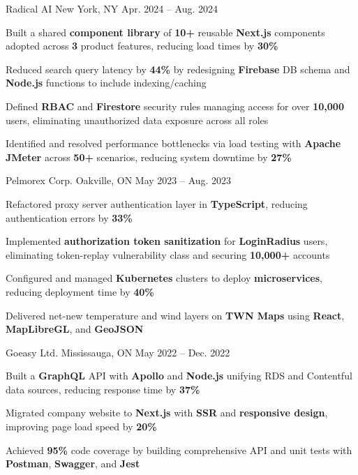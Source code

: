 \documentclass[11pt, a4paper]{awesome-cv}
\begin{document}
\begin{cventries}
  \cventry
    {\color{lightblue}{SOFTWARE ENGINEER INTERN}}
    {Radical AI}
    {New York, NY}
    {Apr. 2024 -- Aug. 2024}
    {
      \begin{cvitems}
        \item{Built a shared \textbf{component library} of \textbf{10+} reusable \textbf{Next.js} components adopted across \textbf{3} product features, reducing load times by \textbf{30\%}}
        \item{Reduced search query latency by \textbf{44\%} by redesigning \textbf{Firebase} DB schema and \textbf{Node.js} functions to include indexing/caching}
        \item{Defined \textbf{RBAC} and \textbf{Firestore} security rules managing access for over \textbf{10,000} users, eliminating unauthorized data exposure across all roles}
        \item{Identified and resolved performance bottlenecks via load testing with \textbf{Apache JMeter} across \textbf{50+} scenarios, reducing system downtime by \textbf{27\%}}
      \end{cvitems}
    }

  \vspace{3mm}

  \cventry
    {\color{lightblue}{SOFTWARE ENGINEER INTERN}}
    {Pelmorex Corp.}
    {Oakville, ON}
    {May 2023 -- Aug. 2023}
    {
      \begin{cvitems}
        \item{Refactored proxy server authentication layer in \textbf{TypeScript}, reducing authentication errors by \textbf{33\%}}
        \item{Implemented \textbf{authorization token sanitization} for \textbf{LoginRadius} users, eliminating token-replay vulnerability class and securing \textbf{10,000+} accounts}
        \item{Configured and managed \textbf{Kubernetes} clusters to deploy \textbf{microservices}, reducing deployment time by \textbf{40\%}}
        \item{Delivered net-new temperature and wind layers on \textbf{TWN Maps} using \textbf{React}, \textbf{MapLibreGL}, and \textbf{GeoJSON}}
      \end{cvitems}
    }

  \vspace{3mm}

  \cventry
    {\color{lightblue}{FRONT-END DEVELOPER INTERN}}
    {Goeasy Ltd.}
    {Mississauga, ON}
    {May 2022 -- Dec. 2022}
    {
      \begin{cvitems}
        \item{Built a \textbf{GraphQL} API with \textbf{Apollo} and \textbf{Node.js} unifying RDS and Contentful data sources, reducing response time by \textbf{37\%}}
        \item{Migrated company website to \textbf{Next.js} with \textbf{SSR} and \textbf{responsive design}, improving page load speed by \textbf{20\%}}
        \item{Achieved \textbf{95\%} code coverage by building comprehensive API and unit tests with \textbf{Postman}, \textbf{Swagger}, and \textbf{Jest}}
      \end{cvitems}
    }


\end{cventries}
\end{document}
